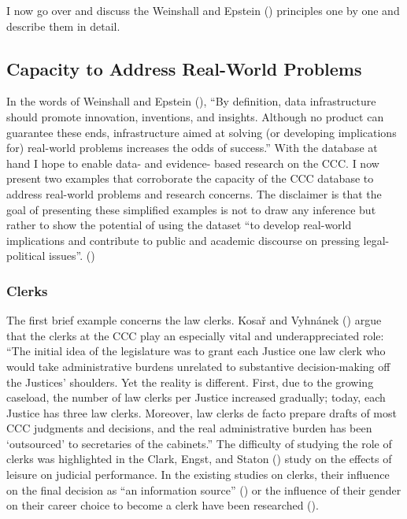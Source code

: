 \documentclass[
  11pt,
]{article}
\begin{document}
I now go over and discuss the Weinshall and Epstein () principles one by one and describe them in detail.

\subsection{Capacity to Address Real-World Problems}\label{capacity}

In the words of Weinshall and Epstein (), ``By definition, data infrastructure should promote innovation, inventions, and insights. Although no product can guarantee these ends, infrastructure aimed at solving (or developing implications for) real-world problems increases the odds of success.'' With the database at hand I hope to enable data- and evidence- based research on the CCC. I now present two examples that corroborate the capacity of the CCC database to address real-world problems and research concerns. The disclaimer is that the goal of presenting these simplified examples is not to draw any inference but rather to show the potential of using the dataset ``to develop real-world implications and contribute to public and academic discourse on pressing legal-political issues''. ()

\subsubsection{Clerks}\label{clerks}

The first brief example concerns the law clerks. Kosař and Vyhnánek () argue that the clerks at the CCC play an especially vital and underappreciated role: ``The initial idea of the legislature was to grant each Justice one law clerk who would take administrative burdens unrelated to substantive decision-making off the Justices' shoulders. Yet the reality is different. First, due to the growing caseload, the number of law clerks per Justice increased gradually; today, each Justice has three law clerks. Moreover, law clerks de facto prepare drafts of most CCC judgments and decisions, and the real administrative burden has been `outsourced' to secretaries of the cabinets.'' The difficulty of studying the role of clerks was highlighted in the Clark, Engst, and Staton () study on the effects of leisure on judicial performance. In the existing studies on clerks, their influence on the final decision as ``an information source'' () or the influence of their gender on their career choice to become a clerk have been researched ().
\end{document}
